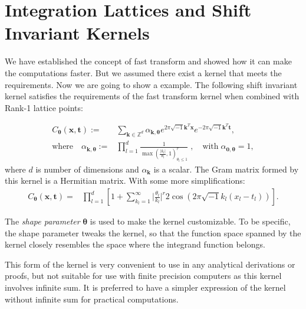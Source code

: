 \documentclass[twocolumn]{svjour3}          %
\newcommand{\bm}[1]{\boldsymbol{#1}}
\newcommand{\vtheta}{{\bm{\theta}}}
\newcommand{\vk}{\bm{k}}
\newcommand{\vt}{\bm{t}}
\newcommand{\vx}{\bm{x}}
\begin{document}
\section{Integration Lattices and Shift Invariant Kernels}
\label{sec:shift_invariant_kernel}
We have established the concept of fast transform and showed how it can make the computations faster. But we assumed there exist a kernel that meets the requirements.
Now we are going to show a example.
The following shift invariant kernel satisfies the requirements of the fast transform kernel when combined with Rank-1 lattice points:

\begin{align}
\label{bayes_SI_kernel}
C_\vtheta(\vx, \vt) := &  \sum_{\vk \in \mathbb{Z}^d} \alpha_{\vk,\vtheta}  e^{2 \pi\sqrt{-1} \vk^T\vx}
e^{-2 \pi\sqrt{-1} \vk^T\vt},
\\
\nonumber
\text{where} \quad
\alpha_{\vk,\vtheta} := & \prod_{l=1}^d \frac{1}{\max(\frac{|k_l|}{\theta_l},1)^r_{\theta_l\leq 1}}  \;,  \quad \text{with} \; {\alpha}_{\bm{0},\vtheta} = 1,
\end{align}
where $d$ is number of dimensions and $\alpha_{\vk}$ is a scalar. The Gram matrix formed by this kernel is a Hermitian matrix. 
With some more simplifications:
\begin{align*}
C_\vtheta(\vx, \vt) = & \prod_{l=1}^d  
\left[ 1 +
\sum_{k_l=1}^\infty
\Big|\frac{\theta_l}{k_l}\Big|^r 
2 \cos({2 \pi\sqrt{-1} k_l(x_l - t_l )})
\right].
\end{align*}

The \textit{shape parameter} $\vtheta$ is used to make the kernel customizable. To be specific, the {shape parameter} tweaks the kernel, so that the function space spanned by the kernel closely resembles the space where the integrand function belongs.

This form of the kernel is very convenient to use in any analytical derivations or proofs, but not suitable for use with finite precision computers as this kernel involves infinite sum. It is preferred to have a simpler expression of the kernel without infinite sum for practical computations. 
\end{document}

